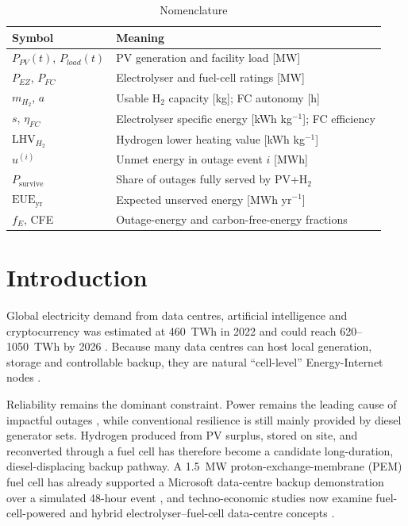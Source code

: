 \documentclass[conference]{IEEEtran}
\begin{document}
\begin{table}[!b]
\centering
\caption{Nomenclature}
\label{tab:nomenclature}
\scriptsize
\setlength{\tabcolsep}{2pt}
\begin{tabular}{@{}p{}p{}@{}}
\toprule
Symbol & Meaning \\
\midrule
$P_{PV}(t)$, $P_{load}(t)$ & PV generation and facility load [MW] \\
$P_{EZ}$, $P_{FC}$ & Electrolyser and fuel-cell ratings [MW] \\
$m_{H_2}$, $a$ & Usable H$_2$ capacity [kg]; FC autonomy [h] \\
$s$, $\eta_{FC}$ & Electrolyser specific energy [kWh kg$^{-1}$]; FC efficiency \\
$\mathrm{LHV}_{H_2}$ & Hydrogen lower heating value [kWh kg$^{-1}$] \\
$u^{(i)}$ & Unmet energy in outage event $i$ [MWh] \\
$P_{\mathrm{survive}}$ & Share of outages fully served by PV+H$_2$ \\
$\mathrm{EUE}_{\mathrm{yr}}$ & Expected unserved energy [MWh yr$^{-1}$] \\
$f_E$, CFE & Outage-energy and carbon-free-energy fractions \\
\bottomrule
\end{tabular}
\end{table}

\section{Introduction}

Global electricity demand from data centres, artificial intelligence and cryptocurrency was estimated at 460~TWh in 2022 and could reach 620--1050~TWh by 2026 \cite{iea2024,figini2025}. Because many data centres can host local generation, storage and controllable backup, they are natural ``cell-level'' Energy-Internet nodes \cite{dong2024}.

Reliability remains the dominant constraint. Power remains the leading cause of impactful outages \cite{uptime2026}, while conventional resilience is still mainly provided by diesel generator sets. Hydrogen produced from PV surplus, stored on site, and reconverted through a fuel cell has therefore become a candidate long-duration, diesel-displacing backup pathway. A 1.5~MW proton-exchange-membrane (PEM) fuel cell has already supported a Microsoft data-centre backup demonstration over a simulated 48-hour event \cite{catmsft2024}, and techno-economic studies now examine fuel-cell-powered and hybrid electrolyser--fuel-cell data-centre concepts \cite{kurtz2023,ai2026}.
\end{document}
